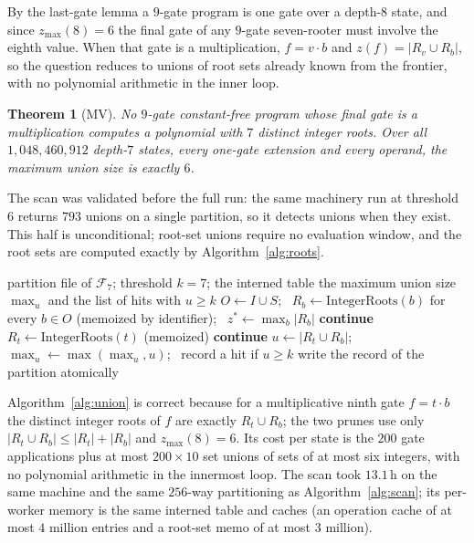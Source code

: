 \documentclass[11pt]{article}
\newtheorem{theorem}{Theorem}[section]
\theoremstyle{definition}
\theoremstyle{remark}
\newcommand{\zmax}{z_{\max}}
\begin{document}
By the last-gate lemma a $9$-gate program is one gate over a depth-$8$ state,
and since $\zmax(8) = 6$ the final gate of any $9$-gate seven-rooter must
involve the eighth value. When that gate is a multiplication, $f = v\cdot b$
and $z(f) = |R_v \cup R_b|$, so the question reduces to unions of root sets
already known from the frontier, with no polynomial arithmetic in the inner
loop.

\begin{theorem}[MV]\label{thm:nine-mult}
No $9$-gate constant-free program whose final gate is a multiplication computes
a polynomial with $7$ distinct integer roots. Over all $1{,}048{,}460{,}912$
depth-$7$ states, every one-gate extension and every operand, the maximum union
size is exactly $6$.
\end{theorem}

The scan was validated before the full run: the same machinery run at threshold $6$
returns $793$ unions on a single partition, so it detects unions when they
exist. This half is unconditional; root-set unions require no evaluation
window, and the root sets are computed exactly by Algorithm~\ref{alg:roots}.

\begin{algorithm}[t]
\caption{Union scan for a multiplicative ninth gate (one worker, one partition).}
\label{alg:union}
\begin{algorithmic}[1]
\Require partition file of $\mathcal{F}_7$; threshold $k = 7$; the interned table
\Ensure the maximum union size $\max_u$ and the list of hits with $u \ge k$
  \State $O \gets I \cup S$; \ $R_b \gets \mathrm{IntegerRoots}(b)$ for every $b \in O$ (memoized by identifier); \ $z^\ast \gets \max_b |R_b|$
   \textbf{continue} \Comment{a union of size $k$ would need $z(t) \ge k > \zmax(8)$}
  \EndIf
    \State $R_t \gets \mathrm{IntegerRoots}(t)$ (memoized)
     \textbf{continue} 
    \EndIf
      \State $u \gets |R_t \cup R_b|$; \ $\max_u \gets \max(\max_u, u)$; \ record a hit if $u \ge k$
    \EndFor
  \EndFor
\EndFor
\State write the record of the partition atomically
\end{algorithmic}
\end{algorithm}

Algorithm~\ref{alg:union} is correct because for a multiplicative ninth gate
$f = t \cdot b$ the distinct integer roots of $f$ are exactly $R_t \cup R_b$; the two
prunes use only $|R_t \cup R_b| \le |R_t| + |R_b|$ and $\zmax(8) = 6$. Its cost per state is
the $200$ gate applications plus at most $200 \times 10$ set unions of sets of at most
six integers, with no polynomial arithmetic in the innermost loop. The scan took $13.1$\,h
on the same machine and the same $256$-way partitioning as Algorithm~\ref{alg:scan}; its
per-worker memory is the same interned table and caches (an operation cache of at most
$4$ million entries and a root-set memo of at most $3$ million).
\end{document}
